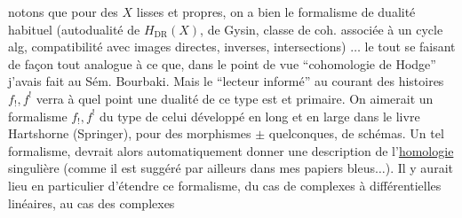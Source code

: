 notons que pour des $X$ lisses et propres, on a bien le formalisme de dualité habituel (autodualité de $H_{\mathrm{DR}}(X)$,   de Gysin, classe de coh. associée à un cycle alg,  compatibilité avec images directes, inverses, intersections) $\ldots$ le tout se faisant de façon tout analogue à ce que, dans le point de vue ``cohomologie de Hodge'' j'avais fait au Sém. Bourbaki.
Mais le ``lecteur informé'' au courant des histoires $f_!,f^!$ verra à quel point une  dualité de ce type est  et primaire.
On aimerait un formalisme $f_!,f^!$ du type de celui développé en long et en large dans le livre Hartshorne (Springer),  pour des morphismes $\pm$ quelconques,  de schémas.
Un tel formalisme,  devrait alors automatiquement donner  une description de l'\uline{homologie} singulière (comme il est suggéré par ailleurs dans mes papiers bleus$\ldots$).
Il y aurait lieu en particulier d'étendre ce formalisme, du cas de complexes à différentielles linéaires, au cas des complexes
